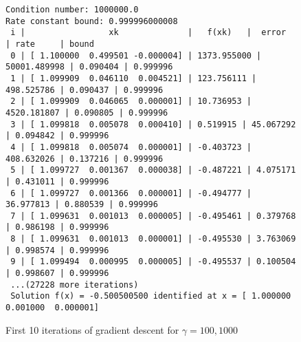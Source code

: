 \begin{solution}
\begin{figure}[h]
\begin{verbatim}
Condition number: 1000000.0
Rate constant bound: 0.999996000008
 i |                 xk              |   f(xk)   |  error   | rate     | bound
 0 | [ 1.100000  0.499501 -0.000004] | 1373.955000 | 50001.489998 | 0.090404 | 0.999996
 1 | [ 1.099909  0.046110  0.004521] | 123.756111 | 498.525786 | 0.090437 | 0.999996
 2 | [ 1.099909  0.046065  0.000001] | 10.736953 | 4520.181807 | 0.090805 | 0.999996
 3 | [ 1.099818  0.005078  0.000410] | 0.519915 | 45.067292 | 0.094842 | 0.999996
 4 | [ 1.099818  0.005074  0.000001] | -0.403723 | 408.632026 | 0.137216 | 0.999996
 5 | [ 1.099727  0.001367  0.000038] | -0.487221 | 4.075171 | 0.431011 | 0.999996
 6 | [ 1.099727  0.001366  0.000001] | -0.494777 | 36.977813 | 0.880539 | 0.999996
 7 | [ 1.099631  0.001013  0.000005] | -0.495461 | 0.379768 | 0.986198 | 0.999996
 8 | [ 1.099631  0.001013  0.000001] | -0.495530 | 3.763069 | 0.998574 | 0.999996
 9 | [ 1.099494  0.000995  0.000005] | -0.495537 | 0.100504 | 0.998607 | 0.999996
 ...(27228 more iterations)
 Solution f(x) = -0.500500500 identified at x = [ 1.000000  0.001000  0.000001]
        \end{verbatim}
        \caption{First 10 iterations of gradient descent for $\gamma = 100, 1000$}
        \label{fig:gamma_100_1000}
    \end{figure}
    \ \\
\end{solution}
